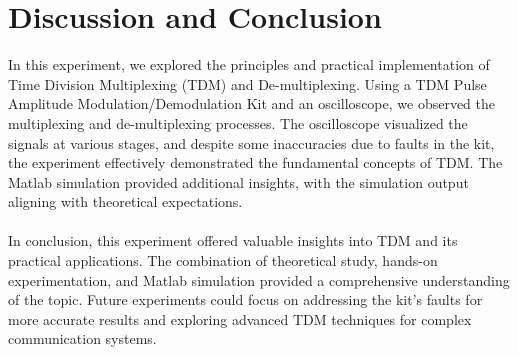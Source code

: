 \documentclass[12pt]{article}
\begin{document}
\section*{Discussion and Conclusion}
In this experiment, we explored the principles and practical implementation of Time Division Multiplexing (TDM) and De-multiplexing. Using a TDM Pulse Amplitude Modulation/Demodulation Kit and an oscilloscope, we observed the multiplexing and de-multiplexing processes. The oscilloscope visualized the signals at various stages, and despite some inaccuracies due to faults in the kit, the experiment effectively demonstrated the fundamental concepts of TDM. The Matlab simulation provided additional insights, with the simulation output aligning with theoretical expectations.
\\\\
In conclusion, this experiment offered valuable insights into TDM and its practical applications. The combination of theoretical study, hands-on experimentation, and Matlab simulation provided a comprehensive understanding of the topic. Future experiments could focus on addressing the kit's faults for more accurate results and exploring advanced TDM techniques for complex communication systems.


\renewcommand{\bibname}{References}

\end{document}

